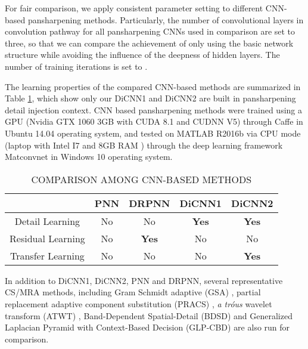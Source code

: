 \documentclass[journal]{IEEEtran}
\begin{document}
For fair comparison, we apply consistent parameter setting to different CNN-based pansharpening methods.
Particularly, the number of convolutional layers in convolution pathway for all pansharpening CNNs used in comparison are set to three, so that we can compare the achievement of only using the basic network structure while avoiding the influence of the deepness of hidden layers. The number of training iterations is set to  .

The learning properties of the compared CNN-based methods are summarized in Table \ref{table:comparison}, which show only our DiCNN1 and DiCNN2 are built in pansharpening detail injection context. CNN based pansharpening methods were trained using a GPU (Nvidia GTX 1060 3GB with CUDA 8.1 and CUDNN V5) through Caffe \cite{Caffe:Jia2014} in Ubuntu 14.04 operating system, and tested on MATLAB R2016b via CPU mode (laptop with Intel I7 and 8GB RAM ) through the deep learning framework Matconvnet \cite{MatconvNet:Vedaldi2015} in Windows 10 operating system.

\begin{table}[h]
\small
\caption{COMPARISON AMONG CNN-BASED METHODS}
\centering
\begin{tabular}{c|cccc}
\hline
{}&PNN&DRPNN&DiCNN1&DiCNN2\\
\hline
Detail Learning& No &No&\textbf{Yes} &\textbf{Yes}\\
\hline
Residual Learning& No &\textbf{Yes} &No &No \\
\hline
Transfer Learning & No &No&No &\textbf{Yes}\\
\hline
\end{tabular}
\label{table:comparison}
\end{table}

In addition to DiCNN1, DiCNN2, PNN and DRPNN, several representative CS/MRA methods, including Gram Schmidt adaptive (GSA) \cite{GS:Aiazzi2007}, partial replacement adaptive component substitution (PRACS) \cite{Choi2010A}, \textit{a tr\'ous} wavelet transform (ATWT) \cite{WDT:Vivone2014}, Band-Dependent Spatial-Detail (BDSD) \cite{Garzelli2007Optimal} and Generalized Laplacian Pyramid with Context-Based Decision (GLP-CBD) \cite{Alparone2007Comparison} are also run for comparison.
\end{document}
